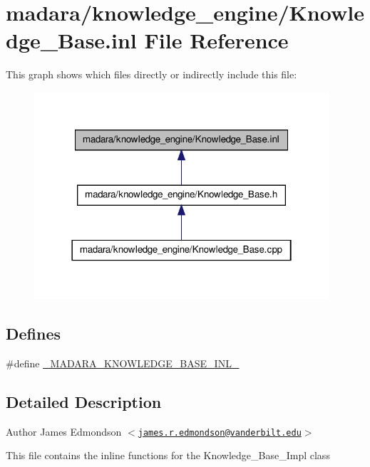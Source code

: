 \hypertarget{Knowledge__Base_8inl}{
\section{madara/knowledge\_\-engine/Knowledge\_\-Base.inl File Reference}
\label{dd/dfb/Knowledge__Base_8inl}
}
This graph shows which files directly or indirectly include this file:
\nopagebreak
\begin{figure}[H]
\begin{center}
\leavevmode
\includegraphics[width=310pt]{df/d4d/Knowledge__Base_8inl__dep__incl}
\end{center}
\end{figure}
\subsection*{Defines}
\begin{DoxyCompactItemize}
\item 
\#define \hyperlink{Knowledge__Base_8inl_aa67d29a2394dfbb0bf77b9a52f7ec64b}{\_\-MADARA\_\-KNOWLEDGE\_\-BASE\_\-INL\_\-}
\end{DoxyCompactItemize}


\subsection{Detailed Description}
\begin{DoxyAuthor}{Author}
James Edmondson $<$\href{mailto:james.r.edmondson@vanderbilt.edu}{\tt james.r.edmondson@vanderbilt.edu}$>$
\end{DoxyAuthor}
This file contains the inline functions for the Knowledge\_\-Base\_\-Impl class 

